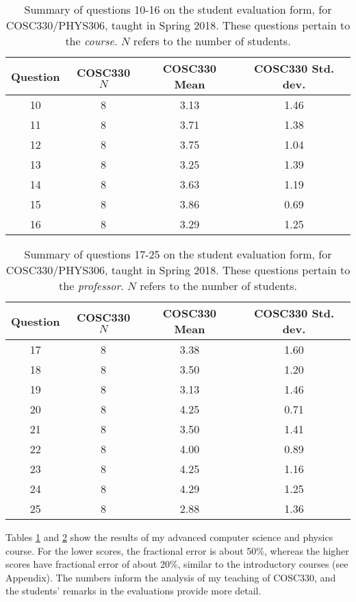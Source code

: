 \documentclass[../../main.tex]{subfiles}
\begin{document}
\label{sec:oof2}

\begin{table}
\small
\centering
\begin{tabular}{| c | c | c | c |}
\hline \hline
Question & COSC330 $N$ & COSC330 Mean & COSC330 Std. dev. \\ \hline
10 & 8 & 3.13 & 1.46 \\ \hline
11 & 8 & 3.71 & 1.38 \\ \hline
12 & 8 & 3.75 & 1.04 \\ \hline
13 & 8 & 3.25 & 1.39 \\ \hline
14 & 8 & 3.63 & 1.19 \\ \hline
15 & 8 & 3.86 & 0.69 \\ \hline
16 & 8 & 3.29 & 1.25 \\ \hline
\hline
\end{tabular}
\caption{\label{tab:courses:adv_eval_1} Summary of questions 10-16 on the student evaluation form, for COSC330/PHYS306, taught in Spring 2018.  These questions pertain to the \textit{course}. $N$ refers to the number of students.}
\end{table}

\begin{table}
\centering
\begin{tabular}{| c | c | c | c |}
\hline \hline
Question & COSC330 $N$ & COSC330 Mean & COSC330 Std. dev. \\ \hline
17 & 8 & 3.38 & 1.60 \\ \hline
18 & 8 & 3.50 & 1.20 \\ \hline
19 & 8 & 3.13 & 1.46 \\ \hline
20 & 8 & 4.25 & 0.71 \\ \hline
21 & 8 & 3.50 & 1.41 \\ \hline
22 & 8 & 4.00 & 0.89 \\ \hline
23 & 8 & 4.25 & 1.16 \\ \hline
24 & 8 & 4.29 & 1.25 \\ \hline
25 & 8 & 2.88 & 1.36 \\ \hline
\hline
\end{tabular}
\caption{\label{tab:courses:adv_eval_2} Summary of questions 17-25 on the student evaluation form, for COSC330/PHYS306, taught in Spring 2018.  These questions pertain to the \textit{professor}. $N$ refers to the number of students.}
\end{table}

Tables \ref{tab:courses:adv_eval_1} and \ref{tab:courses:adv_eval_2} show the results of my advanced computer science and physics course.  For the lower scores, the fractional error is about 50\%, whereas the higher scores have fractional error of about 20\%, similar to the introductory courses (see Appendix). The numbers inform the analysis of my teaching of COSC330, and the students' remarks in the evaluations provide more detail. \\ \hspace{0.1cm}
\end{document}
